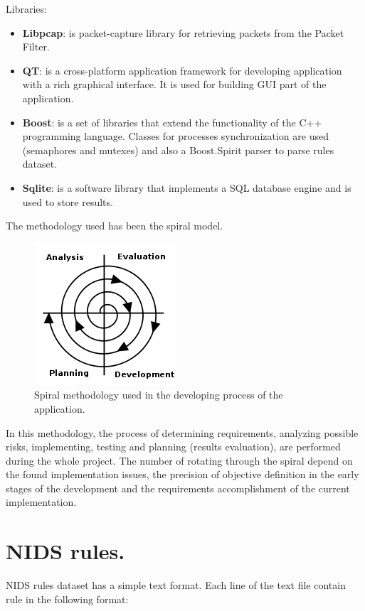 \documentclass[thesis=M,english]{FITthesis}[2011/07/15]
\begin{document}
Libraries:

\begin{itemize}
\item \textbf{Libpcap}\cite{cap_app}: is packet-capture library for retrieving packets from the Packet Filter.
\item \textbf{QT}\cite{qt_project}: is a cross-platform application framework for developing application with a rich graphical interface. It is used for building GUI part of the application.
\item \textbf{Boost}\cite{boost}: is a set of libraries that extend the functionality of the C++ programming language. Classes for processes synchronization are used (semaphores and mutexes) and also a Boost.Spirit parser to parse rules dataset.
\item \textbf{Sqlite}\cite{sqlite}: is a software library that implements a SQL database engine and is used to store results.
\end{itemize}

The methodology used has been the spiral model.
\begin{figure}[h]
\centering
\includegraphics[scale=0.7]{images/spiral-model.png}
\caption{Spiral methodology used in the developing process of the application.}
\end{figure}

In this methodology, the process of determining requirements, analyzing possible risks, implementing, testing and planning (results evaluation), are performed during the whole project. The number of rotating through the spiral depend on the found implementation issues, the precision of objective definition in the early stages of the development and the requirements accomplishment of the current implementation.

\section{NIDS rules.}
NIDS rules dataset has a simple text format. Each line of the text file contain rule in the following format:
\end{document}
